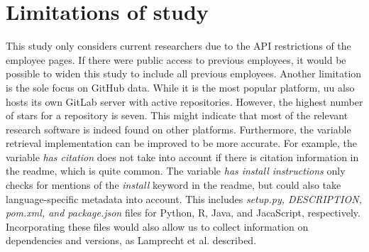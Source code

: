 \section{Limitations of study}
\label{sec:disc:limitations}
This study only considers current researchers due to the API restrictions of the employee pages. If there were public access to previous employees, it would be possible to widen this study to include all previous employees. 
Another limitation is the sole focus on GitHub data. While it is the most popular platform, \acrshort{uu} also hosts its own GitLab server with active repositories. 
However, the highest number of stars for a repository is seven. This might indicate that most of the relevant research software is indeed found on other platforms.
Furthermore, the variable retrieval implementation can be improved to be more accurate. For example, the variable \textit{has citation} does not take into account if there is citation information in the readme, which is quite common. The variable \textit{has install instructions} only checks for mentions of the \textit{install} keyword in the readme, but could also take language-specific metadata into account. This includes \textit{setup.py, DESCRIPTION, pom.xml, and package.json} files for Python, R, Java, and JacaScript, respectively. Incorporating these files would also allow us to collect information on dependencies and versions, as Lamprecht et al. \cite{lamprecht_towards_2020} described.